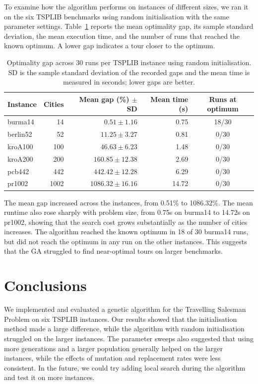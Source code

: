 \documentclass[11pt,a4paper]{article}
\begin{document}
To examine how the algorithm performs on instances of different sizes, we ran
it on the six TSPLIB benchmarks
using random initialisation with the same parameter settings. Table~\ref{tab:scaling-results} reports the mean optimality gap,
its sample standard deviation, the mean execution time, and the number of runs that reached the known optimum.
A lower gap indicates a tour closer to the optimum.
\begin{table}[H]
  \centering
  \small
  \begin{tabular}{lrrrc}
    \toprule
    Instance & Cities & Mean gap (\%) $\pm$ SD & Mean time (s) & Runs at optimum \\
    \midrule
    burma14  & 14   & $0.51 \pm 1.16$       & 0.75 & 18/30 \\
    berlin52 & 52   & $11.25 \pm 3.27$      & 0.81 & 0/30  \\
    kroA100  & 100  & $46.63 \pm 6.23$      & 1.48 & 0/30  \\
    kroA200  & 200  & $160.85 \pm 12.38$    & 2.69 & 0/30  \\
    pcb442   & 442  & $442.42 \pm 12.28$    & 6.29 & 0/30  \\
    pr1002   & 1002 & $1086.32 \pm 16.16$   & 14.72 & 0/30  \\
    \bottomrule
  \end{tabular}
  \caption{Optimality gap across 30 runs per TSPLIB instance using random initialisation. SD is the sample standard deviation of the recorded gaps and the mean time is measured in seconds; lower gaps are better.}
  \label{tab:scaling-results}
\end{table}
The mean gap increased across the instances, from 0.51\% to 1086.32\%. The
mean runtime also rose sharply with problem size, from 0.75s on burma14 to
14.72s on pr1002, showing that the search cost grows substantially as the
number of cities increases. The algorithm reached the known optimum in 18 of 30
burma14 runs, but did not reach the optimum in any run on the other
instances. This suggests that the GA struggled to find near-optimal tours on
larger benchmarks.


\section{Conclusions}
We implemented and evaluated a genetic algorithm for the Travelling Salesman
Problem on six TSPLIB instances. Our results showed that the initialisation
method made a large difference, while the algorithm with random initialisation
struggled on the larger instances. The parameter sweeps also suggested that using more generations
and a larger population generally helped on the larger instances, while the
effects of mutation and replacement rates were less consistent.
In the future, we could try adding local search during the algorithm and test
it on more instances.
\end{document}
